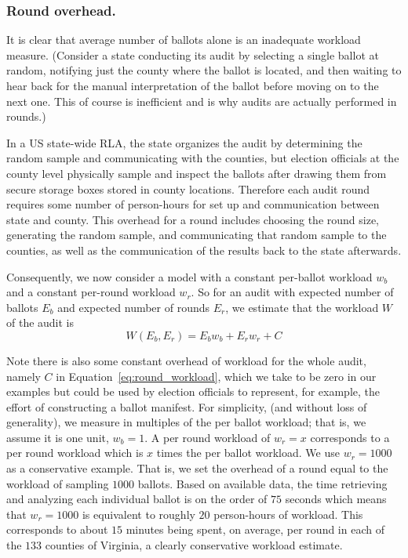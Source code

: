 \subsubsection{Round overhead.} 
It is clear that average number of ballots alone is an inadequate workload measure. 
(Consider a state conducting its audit by selecting a single ballot at random, 
notifying just the county where the ballot is located, and then waiting to hear back for the manual interpretation of the ballot before moving on to the next one. 
This of course is inefficient and is why audits are actually performed in rounds.)

In a US state-wide RLA, the state organizes the audit by determining the random sample and communicating with the counties, but election officials at the county level physically sample and inspect the ballots after drawing them from secure storage boxes stored in county locations. 
Therefore each audit round requires some number of person-hours for set up and communication between state and county. This overhead for a round includes choosing the round size, generating the random sample, and communicating that random sample to the counties, as well as the communication of the results back to the state afterwards. 

Consequently, we now consider a model with a constant per-ballot workload $w_b$ and a constant per-round workload $w_r$.
So for an audit with expected number of ballots $E_{b}$ and expected number of rounds $E_{r}$, we estimate that the workload $W$ of the audit is
\begin{equation}
W(E_b,E_r) = E_b w_b + E_r w_r + C
\label{eq:round_workload}
\end{equation}

Note there is also some constant overhead of workload for the whole audit, namely $C$ in Equation~\ref{eq:round_workload}, which we take to be zero in our examples but could be used by election officials to represent, for example, the effort of constructing a ballot manifest.
For simplicity, (and without loss of generality), we measure in multiples of the per ballot workload; that is, we assume it is one unit, $w_b=1$. A per round workload of $w_r=x$ corresponds to a per round workload which is $x$ times the per ballot workload. We use $w_r=1000$ as a conservative example. 
That is, we set the overhead of a round equal to the workload of sampling $1000$ ballots. Based on available data\cite{RI-report}, the time retrieving and analyzing each individual ballot is on the order of $75$ seconds which means that $w_r=1000$ is equivalent to roughly $20$ person-hours of workload. This corresponds to about $15$ minutes being spent, on average, per round in each of the $133$ counties of Virginia, a clearly conservative workload estimate. 

